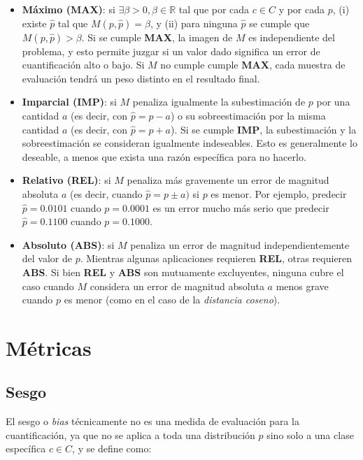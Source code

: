 \begin{itemize}
    \item {\bf Máximo (MAX)}: si $\exists \beta >0, \beta \in \mathbb{R}$ tal
    que por cada $c \in C$ y por cada $p$, (i) existe $\hat p$ tal que $M(p,
    \hat p) = \beta$, y (ii) para ninguna $\hat p$ se cumple que $M(p, \hat p) >
    \beta$. Si se cumple {\bf MAX}, la imagen de $M$ es independiente del
    problema, y esto permite juzgar si un valor dado significa un error de
    cuantificación alto o bajo. Si $M$ no cumple cumple {\bf MAX}, cada muestra
    de evaluación tendrá un peso distinto en el resultado final.
    \item {\bf Imparcial (IMP)}: si $M$ penaliza igualmente la subestimación de
    $p$ por una cantidad $a$ (es decir, con $\hat p = p - a$) o su
    sobreestimación por la misma cantidad $a$ (es decir, con $\hat p = p + a$).
    Si se cumple {\bf IMP}, la subestimación y la sobreestimación se consideran
    igualmente indeseables. Esto es generalmente lo deseable, a menos que exista
    una razón específica para no hacerlo.
    \item {\bf Relativo (REL)}: si $M$ penaliza más gravemente un error de
    magnitud absoluta $a$ (es decir, cuando $\hat p = p \pm a)$ si $p$ es menor.
    Por ejemplo, predecir $\hat p = 0.0101$ cuando $p = 0.0001$ es un error
    mucho más serio que predecir $\hat p = 0.1100$ cuando $p = 0.1000$.
    \item {\bf Absoluto (ABS)}: si $M$ penaliza un error de magnitud
    independientemente del valor de $p$. Mientras algunas aplicaciones requieren
    {\bf REL}, otras requieren {\bf ABS}. Si bien {\bf REL} y {\bf ABS} son
    mutuamente excluyentes, ninguna cubre el caso cuando $M$ considera un error
    de magnitud absoluta $a$ menos grave cuando $p$ es menor (como en el caso de
    la {\it distancia coseno\/}).
\end{itemize}

\section{Métricas}\label{evaluacion:metricas}

\subsection{Sesgo}

El sesgo o {\it bias\/} técnicamente no es una medida de evaluación para la
cuantificación, ya que no se aplica a toda una distribución $p$ sino solo a una
clase específica $c \in C$, y se define como:

